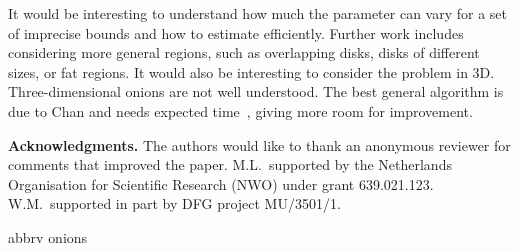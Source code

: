 \documentclass{paper}
\begin{document}
It would be interesting to understand how much the parameter
 can vary for a set of imprecise bounds and how
to estimate  efficiently.
Further work includes considering more
general regions, such as overlapping disks, disks of
different sizes, or fat
regions. It would also be interesting to consider the
problem in 3D. Three-dimensional onions are not
well understood. The best general algorithm is due to Chan
and needs  expected time~\cite{c-addsf3cha2nnq-10}, 
giving more room for improvement.

\noindent\textbf{Acknowledgments.}
The authors would like to thank an anonymous reviewer for comments that improved the paper.
M.L.~supported by the Netherlands Organisation for Scientific 
Research (NWO) under grant 639.021.123.  W.M.~supported in part 
by DFG project MU/3501/1.


 {abbrv}
 {onions}
\end{document}

